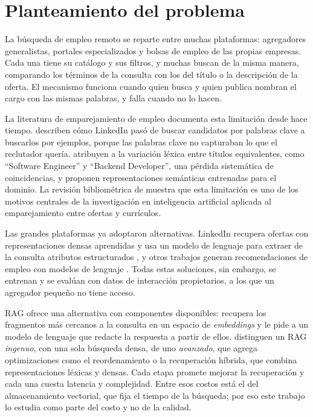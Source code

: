 
\section{Planteamiento del problema}
\label{sec:problema}

La búsqueda de empleo remoto se reparte entre muchas plataformas: agregadores generalistas, portales especializados y bolsas de empleo de las propias empresas. Cada una tiene su catálogo y sus filtros, y muchas buscan de la misma manera, comparando los términos de la consulta con los del título o la descripción de la oferta. El mecanismo funciona cuando quien busca y quien publica nombran el cargo con las mismas palabras, y falla cuando no lo hacen.

La literatura de emparejamiento de empleo documenta esta limitación desde hace tiempo. \citet{HaThuc2017} describen cómo LinkedIn pasó de buscar candidatos por palabras clave a buscarlos por ejemplos, porque las palabras clave no capturaban lo que el reclutador quería. \citet{Bocharova2023} atribuyen a la variación léxica entre títulos equivalentes, como \enquote{Software Engineer} y \enquote{Backend Developer}, una pérdida sistemática de coincidencias, y proponen representaciones semánticas entrenadas para el dominio. La revisión bibliométrica de \citet{RojasGaleano2022} muestra que esta limitación es uno de los motivos centrales de la investigación en inteligencia artificial aplicada al emparejamiento entre ofertas y currículos.

Las grandes plataformas ya adoptaron alternativas. LinkedIn recupera ofertas con representaciones densas aprendidas \citep{Shen2024} y usa un modelo de lenguaje para extraer de la consulta atributos estructurados \citep{Liu2025}, y otros trabajos generan recomendaciones de empleo con modelos de lenguaje \citep{ZhengGIRL2023}. Todas estas soluciones, sin embargo, se entrenan y se evalúan con datos de interacción propietarios, a los que un agregador pequeño no tiene acceso.

RAG \citep{Lewis2020} ofrece una alternativa con componentes disponibles: recupera los fragmentos más cercanos a la consulta en un espacio de \textit{embeddings} y le pide a un modelo de lenguaje que redacte la respuesta a partir de ellos. \citet{Gao2023} distinguen un RAG \emph{ingenuo}, con una sola búsqueda densa, de uno \emph{avanzado}, que agrega optimizaciones como el reordenamiento o la recuperación híbrida, que combina representaciones léxicas y densas. Cada etapa promete mejorar la recuperación y cada una cuesta latencia y complejidad. Entre esos costos está el del almacenamiento vectorial, que fija el tiempo de la búsqueda; por eso este trabajo lo estudia como parte del costo y no de la calidad.

